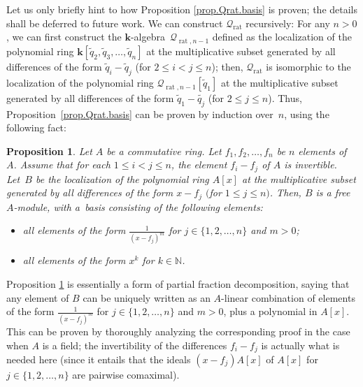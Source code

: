 \documentclass[pdftex]{sigma}
\newtheorem{Proposition}[Theorem]{Proposition}
\numberwithin{equation}{section}
\begin{document}
Let us only briefly hint to how Proposition \ref{prop.Qrat.basis} is proven; the details shall be deferred to future work. We can construct $\mathcal{Q}_{\operatorname*{rat}}$ recursively: For any $n>0$, we can first construct the $\mathbf{k}$-algebra~$\mathcal{Q}_{\operatorname*{rat},n-1}$ defined as the localization of the polynomial ring $\mathbf{k}[ \widetilde{q}_{2},\widetilde{q}_{3},\ldots,\widetilde{q}_{n}] $ at the multiplicative subset generated by all differences of the form $\widetilde{q}_{i}-\widetilde{q}_{j}$ (for $2\leq i<j\leq n$); then, $\mathcal{Q}_{\operatorname*{rat}}$ is isomorphic to the localization of the polynomial ring $\mathcal{Q}_{\operatorname*{rat},n-1} [ \widetilde{q}_{1} ] $ at the multiplicative subset generated by all differences of the form $\widetilde{q}_{1}-\widetilde{q_{j}}$ (for $2\leq j\leq n$). Thus, Proposition~\ref{prop.Qrat.basis} can be proven by induction over~$n$, using the following fact:

\begin{Proposition} \label{prop.Qrat.indstep}Let $A$ be a commutative ring. Let $f_{1},f_{2},\ldots,f_{n}$ be $n$ elements of~$A$. Assume that for each $1\leq i<j\leq n$, the element $f_{i}-f_{j}$ of $A$ is invertible. Let~$B$ be the localization of the polynomial ring $A[x] $ at the multiplicative subset generated by all differences of the form $x-f_{j}$ $($for $1\leq j\leq n)$. Then, $B$ is a free $A$-module, with a~basis consisting of the following elements:
\begin{itemize}\itemsep=0pt
\item all elements of the form $\frac{1}{( x-f_{j}) ^{m}}$ for $j\in \{ 1,2,\ldots,n \} $ and $m>0$;
\item all elements of the form $x^{k}$ for $k\in\mathbb{N}$.
\end{itemize}
\end{Proposition}

Proposition \ref{prop.Qrat.indstep} is essentially a form of partial fraction decomposition, saying that any element of $B$ can be uniquely written as an $A$-linear combination of elements of the form $\frac{1}{(x-f_{j}) ^{m}}$ for $j\in \{ 1,2,\ldots,n\} $ and $m>0$, plus a polynomial in $A[x] $. This can be proven by thoroughly analyzing the corresponding proof in the case when $A$ is a field; the
invertibility of the differences $f_{i}-f_{j}$ is actually what is needed here (since it entails that the ideals $ ( x-f_{j} ) A [ x]
$ of $A[x] $ for $j\in \{ 1,2,\ldots,n \} $ are pairwise comaximal).
\end{document}
